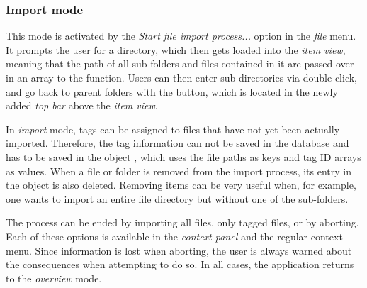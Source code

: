 \subsubsection{Import mode}

This mode is activated by the \emph{Start file import process...} option in the \emph{file} menu. It prompts the user for a directory, which then gets loaded into the \emph{item view}, meaning that the path of all sub-folders and files contained in it are passed over in an array to the  function. Users can then enter sub-directories via double click, and go back to parent folders with the \tfcode{^} button, which is located in the newly added \emph{top bar} above the \emph{item view}.

In \emph{import} mode, tags can be assigned to files that have not yet been actually imported. Therefore, the tag information can not be saved in the database and has to be saved in the object , which uses the file paths as keys and tag ID arrays as values. When a file or folder is removed from the import process, its entry in the object is also deleted. Removing items can be very useful when, for example, one wants to import an entire file directory but without one of the sub-folders.

The process can be ended by importing all files, only tagged files, or by aborting. Each of these options is available in the \emph{context panel} and the regular context menu. Since information is lost when aborting, the user is always warned about the consequences when attempting to do so. In all cases, the application returns to the \emph{overview} mode.
